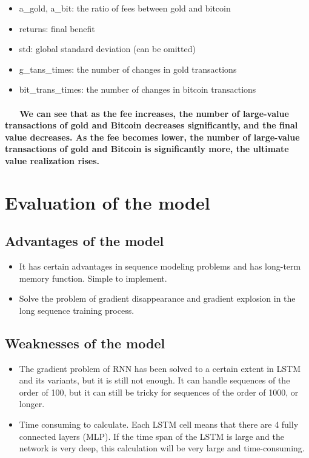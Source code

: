 \documentclass{mcmthesis}
\begin{document}
	\begin{itemize}
		\item a\_gold, a\_bit: the ratio of fees between gold and bitcoin
		\item returns: final benefit
		\item std: global standard deviation (can be omitted)
		\item g\_tans\_times: the number of changes in gold transactions
		\item bit\_trans\_times: the number of changes in bitcoin transactions
	\end{itemize}

	\paragraph{
		\ \ \ We can see that as the fee increases, the number of large-value transactions of gold and Bitcoin decreases significantly, and the final value decreases. As the fee becomes lower, the number of large-value transactions of gold and Bitcoin is significantly more, the ultimate value realization rises. 
	}
	
	\section{Evaluation of the model }
	\subsection{Advantages of the model}
	\begin{itemize}
		\item It has certain advantages in sequence modeling problems and has long-term memory function. Simple to implement.
		\item Solve the problem of gradient disappearance and gradient explosion in the long sequence training process.
	\end{itemize}
	\subsection{Weaknesses of the model}
	\begin{itemize}
		\item The gradient problem of RNN has been solved to a certain extent in LSTM and its variants, but it is still not enough. It can handle sequences of the order of 100, but it can still be tricky for sequences of the order of 1000, or longer.
		\item Time consuming to calculate. Each LSTM cell means that there are 4 fully connected layers (MLP). If the time span of the LSTM is large and the network is very deep, this calculation will be very large and time-consuming.
	\end{itemize}
	
\end{document}

